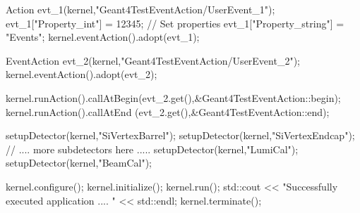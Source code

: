 \begin{code}
{  Action evt_1(kernel,"Geant4TestEventAction/UserEvent_1");
  evt_1["Property_int"] = 12345;                    // Set properties
  evt_1["Property_string"] = "Events";
  kernel.eventAction().adopt(evt_1);

  EventAction evt_2(kernel,"Geant4TestEventAction/UserEvent_2");
  kernel.eventAction().adopt(evt_2);

  kernel.runAction().callAtBegin(evt_2.get(),&Geant4TestEventAction::begin);
  kernel.runAction().callAtEnd  (evt_2.get(),&Geant4TestEventAction::end);
 
  setupDetector(kernel,"SiVertexBarrel");
  setupDetector(kernel,"SiVertexEndcap");
  // .... more subdetectors here .....
  setupDetector(kernel,"LumiCal");
  setupDetector(kernel,"BeamCal");

  kernel.configure();
  kernel.initialize();
  kernel.run();
  std::cout << "Successfully executed application .... " << std::endl;
  kernel.terminate();
}
\end{code}

